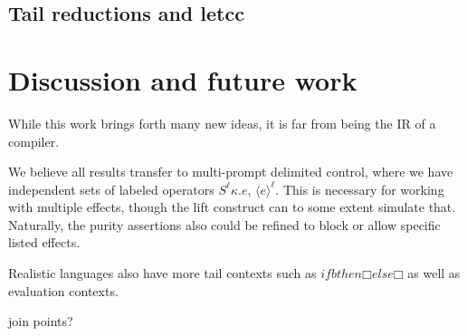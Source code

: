 \documentclass[a4paper, 11pt,titlepage, openright, twoside]{report}
\newcommand{\+}{\enspace}
\begin{document}
\section*{Tail reductions and letcc}

\chapter{Discussion and future work}

While this work brings forth many new ideas, it is far from being the IR of a compiler.

We believe all results transfer to multi-prompt delimited control, where we have independent sets of labeled operators $S^\ell κ. e$, $⟨e⟩^\ell$.
This is necessary for working with multiple effects, though the lift construct can to some extent simulate that.
Naturally, the purity assertions also could be refined to block or allow specific listed effects.

Realistic languages also have more tail contexts such as $if b then □ else □$ as well as evaluation contexts.

join points?





\hfuzz=1pt
\printbibliography[heading=bibintoc]
\end{document}
